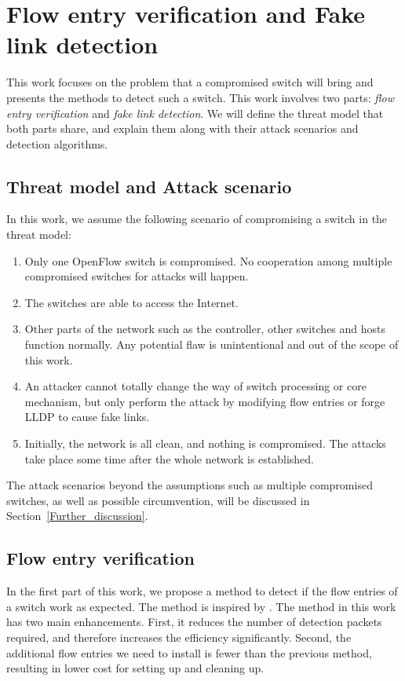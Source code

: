 \chapter{Flow entry verification and Fake link detection}
This work focuses on the problem that a compromised switch will bring and presents the methods to detect such a switch. This work involves two parts: \textit{flow entry verification} and \textit{fake link detection}. We will define the threat model that both parts share, and explain them along with their attack scenarios and detection algorithms.

\section{Threat model and Attack scenario}
In this work, we assume the following scenario of compromising a switch in the threat model:
\begin{enumerate}
\item
Only one OpenFlow switch is compromised. No cooperation among multiple compromised switches for attacks will happen.
\item
The switches are able to access the Internet. 
\item
Other parts of the network such as the controller, other switches and hosts function normally. Any potential flaw is unintentional and out of the scope of this work.
\item
An attacker cannot totally change the way of switch processing or core mechanism, but only perform the attack by modifying flow entries or forge LLDP to cause fake links.
\item
Initially, the network is all clean, and nothing is compromised. The attacks take place some time after the whole network is established.
\end{enumerate}

The attack scenarios beyond the assumptions such as multiple compromised switches, as well as possible circumvention, will be discussed in Section~\ref{Further_discussion}.

\section{Flow entry verification}
In the first part of this work, we propose a method to detect if the flow entries of a switch work as expected. The method is inspired by \cite{CKGL15}. The method in this work has two main enhancements. First, it reduces the number of detection packets required, and therefore increases the efficiency significantly. Second, the additional flow entries we need to install is fewer than the previous method, resulting in lower cost for setting up and cleaning up. 

